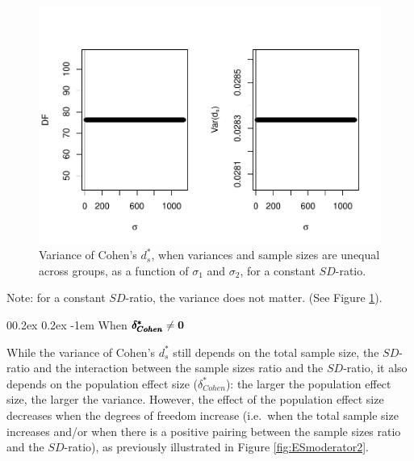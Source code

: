 \documentclass[
  english,
  man,mask]{apa6}
\makeatletter
\let\oldparagraph\paragraph
\renewcommand{\paragraph}[1]{\oldparagraph{#1}\mbox{}}
\renewcommand{\paragraph}{\@startsection{paragraph}{4}{\parindent}%
  {0\baselineskip \@plus 0.2ex \@minus 0.2ex}%
  {-1em}%
  {\normalfont\normalsize\bfseries\itshape\typesectitle}}
\makeatother
\begin{document}
\begin{figure}
\centering
\includegraphics{Theoretical-Variance-of-all-estimators-as-a-function-of-population-parameters_files/figure-latex/varcohendprimehetunbalvariance2-1.pdf}
\caption{\label{fig:varcohendprimehetunbalvariance2}Variance of Cohen's \(d^*_s\), when variances and sample sizes are unequal across groups, as a function of \(\sigma_1\) and \(\sigma_2\), for a constant \(SD\)-ratio.}
\end{figure}

Note: for a constant \(SD\)-ratio, the variance does not matter. (See Figure \ref{fig:varcohendprimehetunbalvariance2}).

\hypertarget{when-bf-pmbdelta_cohen-neq-0-3}{%
\paragraph{\texorpdfstring{When \(\bf \pmb{\delta^*_{Cohen}} \neq 0\)}{When \textbackslash bf \textbackslash pmb\{\textbackslash delta\^{}*\_\{Cohen\}\} \textbackslash neq 0}}\label{when-bf-pmbdelta_cohen-neq-0-3}}

While the variance of Cohen's \(d^*_s\) still depends on the total sample size, the \(SD\)-ratio and the interaction between the sample sizes ratio and the \(SD\)-ratio, it also depends on the population effect size (\(\delta^*_{Cohen}\)): the larger the population effect size, the larger the variance. However, the effect of the population effect size decreases when the degrees of freedom increase (i.e.~when the total sample size increases and/or when there is a positive pairing between the sample sizes ratio and the \(SD\)-ratio), as previously illustrated in Figure \ref{fig:ESmoderator2}.
\end{document}
